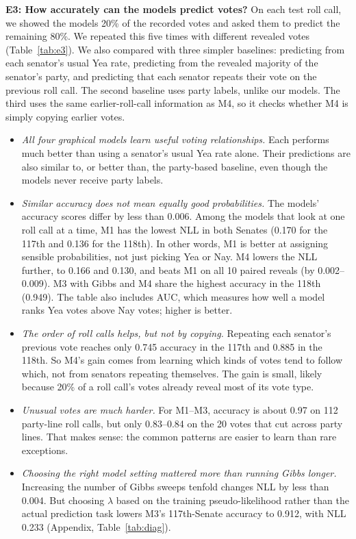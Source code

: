 \documentclass[10pt]{article}
\begin{document}
\textbf{E3: How accurately can the models predict votes?} On each test roll call, we showed the models 20\% of the recorded votes and asked them to predict the remaining 80\%. We repeated this five times with different revealed votes (Table~\ref{tab:e3}). We also compared with three simpler baselines: predicting from each senator's usual Yea rate, predicting from the revealed majority of the senator's party, and predicting that each senator repeats their vote on the previous roll call. The second baseline uses party labels, unlike our models. The third uses the same earlier-roll-call information as M4, so it checks whether M4 is simply copying earlier votes.
\begin{itemize}
\item \emph{All four graphical models learn useful voting relationships.} Each performs much better than using a senator's usual Yea rate alone. Their predictions are also similar to, or better than, the party-based baseline, even though the models never receive party labels.
\item \emph{Similar accuracy does not mean equally good probabilities.} The models' accuracy scores differ by less than 0.006. Among the models that look at one roll call at a time, M1 has the lowest NLL in both Senates (0.170 for the 117th and 0.136 for the 118th). In other words, M1 is better at assigning sensible probabilities, not just picking Yea or Nay. M4 lowers the NLL further, to 0.166 and 0.130, and beats M1 on all 10 paired reveals (by 0.002--0.009). M3 with Gibbs and M4 share the highest accuracy in the 118th (0.949). The table also includes AUC, which measures how well a model ranks Yea votes above Nay votes; higher is better.
\item \emph{The order of roll calls helps, but not by copying.} Repeating each senator's previous vote reaches only 0.745 accuracy in the 117th and 0.885 in the 118th. So M4's gain comes from learning which kinds of votes tend to follow which, not from senators repeating themselves. The gain is small, likely because 20\% of a roll call's votes already reveal most of its vote type.
\item \emph{Unusual votes are much harder.} For M1--M3, accuracy is about 0.97 on 112 party-line roll calls, but only 0.83--0.84 on the 20 votes that cut across party lines. That makes sense: the common patterns are easier to learn than rare exceptions.
\item \emph{Choosing the right model setting mattered more than running Gibbs longer.} Increasing the number of Gibbs sweeps tenfold changes NLL by less than 0.004. But choosing $\lambda$ based on the training pseudo-likelihood rather than the actual prediction task lowers M3's 117th-Senate accuracy to 0.912, with NLL 0.233 (Appendix, Table~\ref{tab:diag}).
\end{itemize}
\end{document}
